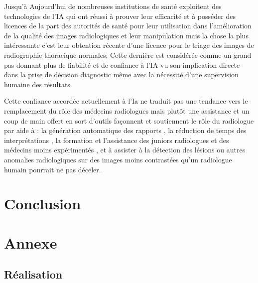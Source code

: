 \documentclass[12pt]{report}
\begin{document}
    Jusqu'à Aujourd'hui de nombreuses institutions de santé exploitent des technologies de l’IA qui ont réussi à prouver leur efficacité et à posséder des licences de la part des autorités de santé pour leur utilisation dans l'amélioration de la qualité des images radiologiques et leur manipulation mais la chose la plus intéressante c'est leur obtention récente d’une licence pour le triage des images de radiographie thoracique normales; Cette dernière est considérée comme un grand pas donnant plus de fiabilité et de confiance à l’IA  vu son implication directe dans la prise de décision diagnostic même avec la nécessité d’une supervision humaine des résultats.

    Cette confiance accordée actuellement à l’Ia ne traduit pas une tendance vers le remplacement du rôle des médecins radiologues mais plutôt une assistance et un coup de main offert en sort d’outils façonnent et soutiennent le rôle du  radiologue par aide à : la génération automatique des rapports , la réduction de temps des interprétations , la formation et l’assistance des juniors radiologues et des médecins moins expérimentés , et à assister à la détection des lésions ou autres anomalies radiologiques sur des images moins contrastées qu’un radiologue humain pourrait ne pas déceler. 


    \label{general_project_context}
    
    
    

    \chapter*{Conclusion}
    \clearpage

    \chapter*{Annexe}
    \section{Réalisation}
\end{document}
